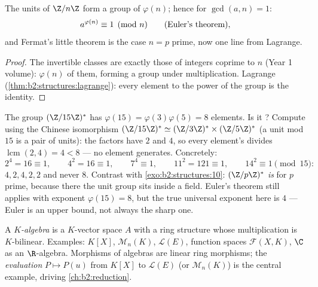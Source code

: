 \begin{theorem}\label{thm:b2:structures:euler}
The units of $\Z/n\Z$ form a group of  $\varphi(n)$; hence for
$\gcd(a, n) = 1$:
\[
a^{\varphi(n)} \equiv 1 \pmod n
\qquad (\text{Euler's theorem\index{Euler's theorem}}),
\]
and Fermat's little theorem is the case $n = p$ prime, now one line
from Lagrange.
\end{theorem}

\begin{proof}
The invertible classes are exactly those of integers coprime to $n$
(Year 1 volume): $\varphi(n)$ of them, forming a group under
multiplication. Lagrange (\cref{thm:b2:structures:lagrange}):
every element to the power of the group  is the identity.
\end{proof}

\begin{example}\label{ex:b2:structures:units15}
The group $(\Z/15\Z)^*$ has $\varphi(15) = \varphi(3)\varphi(5)
= 8$ elements. Is it ? Compute  using the Chinese
isomorphism $(\Z/15\Z)^* \simeq (\Z/3\Z)^* \times (\Z/5\Z)^*$
(a unit mod $15$ is a pair of units): the factors have 
$2$ and $4$, so every element's  divides
$\operatorname{lcm}(2, 4) = 4 < 8$ --- no element generates.
Concretely:
\[
2^4 = 16 \equiv 1, \qquad
4^2 = 16 \equiv 1, \qquad
7^4 \equiv 1, \qquad
11^2 = 121 \equiv 1, \qquad
14^2 \equiv 1 \pmod{15} :
\]
 $4, 2, 4, 2, 2$ and never $8$. Contrast with
\cref{exo:b2:structures:10}: $(\Z/p\Z)^*$ \emph{is}  for
$p$ prime, because there the unit group sits inside a field.
Euler's theorem still applies with exponent $\varphi(15) = 8$,
but the true universal exponent here is $4$ --- Euler is an
upper bound, not always the sharp one.
\end{example}

\begin{definition}[Algebra]\label{def:b2:structures:algebra}
A \emph{$K$-algebra} is a $K$-vector space $A$ with a
ring structure whose multiplication is $K$-bilinear. Examples:
$K[X]$, $\mathcal{M}_n(K)$, $\mathcal{L}(E)$, function spaces
$\mathcal{F}(X, K)$, $\C$ as an $\R$-algebra. Morphisms of algebras
are linear ring morphisms; the \emph{evaluation} $P \mapsto P(u)$
from $K[X]$ to $\mathcal{L}(E)$ (or $\mathcal{M}_n(K)$) is the
central example, driving \cref{ch:b2:reduction}.
\end{definition}

